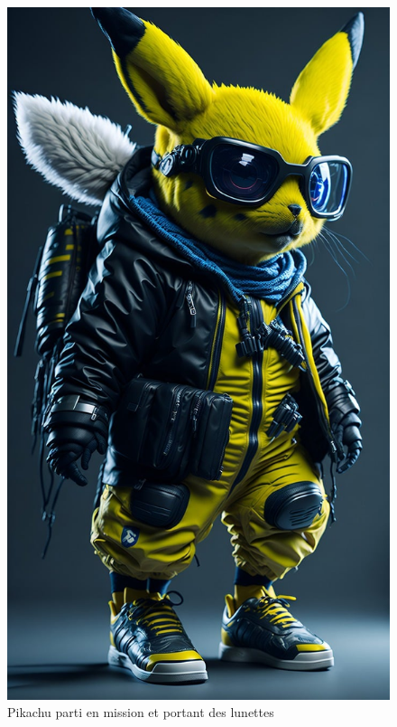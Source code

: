\documentclass[../main.tex]{subfiles}
\begin{document}
\begin{figure}[h]
  \centering
  \includegraphics[width=\textwidth,height=0.4\textheight,keepaspectratio]{images/pokemons/pikachu_style}
  \captionsetup{font=small,labelfont=bf, justification=centering}
  \caption{Pikachu parti en mission et portant des lunettes}
  \label{fig:pikachu_style}
\end{figure}
\end{document}
